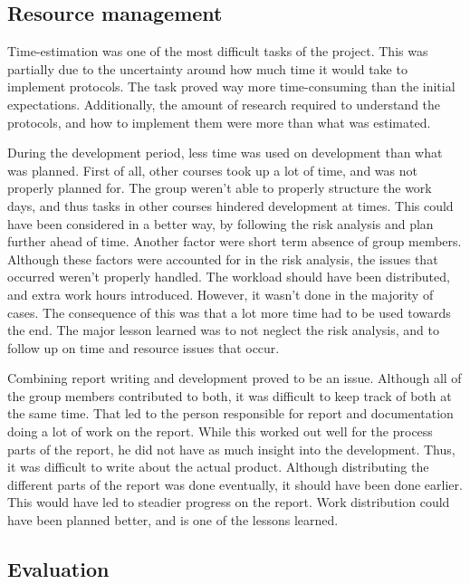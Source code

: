 \subsection{Resource management}
\label{subsec:project_evaluation-development-time_management}

Time-estimation was one of the most difficult tasks of the project. This was partially due to the uncertainty around how much time it would take to implement protocols. The task proved way more time-consuming than the initial expectations. Additionally, the amount of research required to understand the protocols, and how to implement them were more than what was estimated.

During the development period, less time was used on development than what was planned. First of all, other courses took up a lot of time, and was not properly planned for. The group weren't able to properly structure the work days, and thus tasks in other courses hindered development at times. This could have been considered in a better way, by following the risk analysis and plan further ahead of time. Another factor were short term absence of group members. Although these factors were accounted for in the risk analysis, the issues that occurred weren't properly handled. The workload should have been distributed, and extra work hours introduced. However, it wasn't done in the majority of cases. The consequence of this was that a lot more time had to be used towards the end. The major lesson learned was to not neglect the risk analysis, and to follow up on time and resource issues that occur. 

Combining report writing and development proved to be an issue. Although all of the group members contributed to both, it was difficult to keep track of both at the same time. That led to the person responsible for report and documentation doing a lot of work on the report. While this worked out well for the process parts of the report, he did not have as much insight into the development. Thus, it was difficult to write about the actual product. Although distributing the different parts of the report was done eventually, it should have been done earlier. This would have led to steadier progress on the report. Work distribution could have been planned better, and is one of the lessons learned.

\subsection{Evaluation}
\label{subsec:project_evaluation-development-evaluation}

